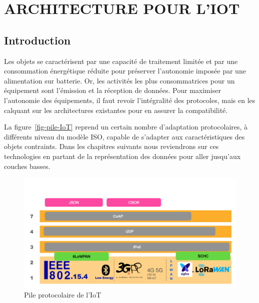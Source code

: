 \chapter{ARCHITECTURE POUR L'IOT}

\section{Introduction}
  
    \vspace{1em}
   
 \begin{figure}
\end{figure}

Les objets se caractérisent 
par 
une capacité
de traitement limitée et par une consommation énergétique réduite pour préserver l’autonomie imposée par une alimentation sur batterie.
Or, les activités les plus consommatrices pour un équipement sont l’émission et la réception de données. 
Pour maximiser l’autonomie des équipements, il faut revoir l’intégralité des protocoles, mais en les calquant sur les architectures existantes pour en assurer la compatibilité. 

La figure~\vref{fig-pile-IoT} reprend un certain nombre d'adaptation protocolaires, à différents niveau du modèle \ac{ISO}, capable de s'adapter aux caractéristiques des objets contraints. Dans les chapitres suivants nous reviendrons sur ces technologies en partant de la représentation des données pour aller jusqu'aux couches basses.

\begin{figure}[tbp]
\centerline{\includegraphics[width=1\columnwidth]{Pictures/Capture17.png}}
\caption{Pile protocolaire de l'IoT}
\label{fig-pile-IoT}
\end{figure}

